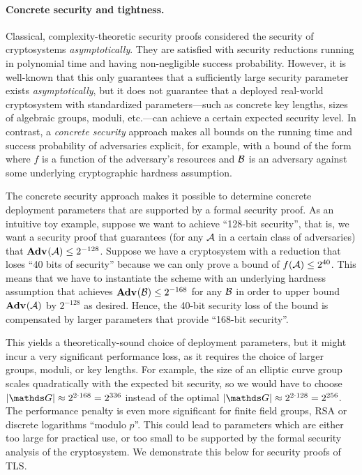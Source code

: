\paragraph{Concrete security and tightness.}
Classical, complexity-theoretic security proofs considered the security of cryptosystems \emph{asymptotically}.
They are satisfied with security reductions running in polynomial time and having non-negligible success probability.
However, it is well-known that this only guarantees that a sufficiently large security parameter exists \emph{asymptotically},
but it does not guarantee that a deployed real-world cryptosystem with standardized parameters---such as concrete key lengths, sizes of algebraic groups, moduli, etc.---can achieve a certain expected security level.
In contrast, a \emph{concrete security} approach makes all bounds on the running time and success probability of adversaries explicit, for example, with a bound of the form
\newcommand{\Reduction}{\mathcal{R}}%
\newcommand{\boundFunc}{f}%
\shortlongeqn[,]{
\genAdv{}{}{\advA} \leq \boundFunc(\advA) \cdot \genAdv{}{}{\advB}
}
where $\boundFunc$ is a function of the adversary's resources and $\mathcal{B}$ is an adversary against some underlying cryptographic hardness assumption. 

The concrete security approach makes it possible to determine concrete deployment parameters that are supported by a formal security proof.
As an intuitive toy example, suppose we want to achieve ``128-bit security'', that is, we want a security proof that guarantees (for any $\mathcal{A}$ in a certain class of adversaries) that $\mathbf{Adv}^{\mathrm{}}_{}(\mathcal{A}) \leq 2^{-128}$.
Suppose we have a cryptosystem with a reduction that loses ``40 bits of security'' because we can only prove a bound of $\boundFunc(\advA) \leq 2^{40}$.
This means that we have to instantiate the scheme with an underlying hardness assumption that achieves $\mathbf{Adv}^{\mathrm{}}_{}(\mathcal{B}) \leq 2^{-168}$ for any $\mathcal{B}$ in order to upper bound $\mathbf{Adv}^{\mathrm{}}_{}(\mathcal{A})$ by
$2^{-128}$ as desired.
Hence, the 40-bit security loss of the bound is compensated by larger parameters that provide ``168-bit security''.

This yields a theoretically-sound choice of deployment parameters, but it might incur a very significant performance loss, as it requires the choice of larger groups, moduli, or key lengths.
For example, the size of an elliptic curve group scales quadratically with the expected bit security, so we would have to choose $|\G| \approx 2^{2 \cdot 168} = 2^{336}$ instead of the optimal  $|\G| \approx 2^{2 \cdot 128} = 2^{256}$.
The performance penalty is even more significant for finite field groups, RSA or discrete logarithms ``modulo $p$''.
This could lead to parameters which are either too large for practical use, or too small to be supported by the formal security analysis of the cryptosystem.
We demonstrate this below for security proofs of TLS.

